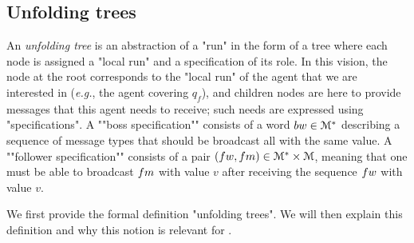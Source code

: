 %	


\subsection{Unfolding trees}
\label{sec:decidability-tree-unfoldings}

An \emph{unfolding tree} is an abstraction of a "run" in the form of a tree where each node is assigned a "local run" and a specification of its role. In this vision, the node at the root corresponds to the "local run" of the agent that we are interested in (\emph{e.g.}, the agent covering $q_f$), and children nodes are here to provide messages that this agent needs to receive; such needs are expressed using "specifications". 
A ""boss specification"" consists of a word $\bossspec \in \messages^*$ describing a sequence of message types that should be broadcast all with the same value. A ""follower specification"" consists of a pair $(\followwordspec, \followmessagespec) \in \messages^*\times \messages$, meaning that one must be able to broadcast $\followmessagespec$ with value $v$ after receiving the sequence $\followwordspec$ with value $v$. 

We first provide the formal definition "unfolding trees". We will then explain this definition and why this notion is relevant for \COVER. 

